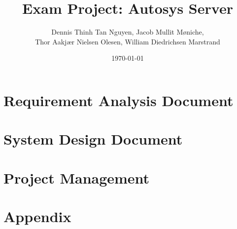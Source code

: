 \documentclass{article}
\author{Dennis Thinh Tan Nguyen, Jacob Mullit Møniche,\\
	 Thor Aakjær Nielsen Olesen, William Diedrichsen Marstrand}
\title{Exam Project: Autosys Server}
\date{\today}
\begin{document}
\maketitle
\newpage

\tableofcontents
\pagebreak

\section{ Requirement Analysis Document}
	
\section{System Design Document}		
	
\section{Project Management}
	

	\section{Appendix}
\end{document}
